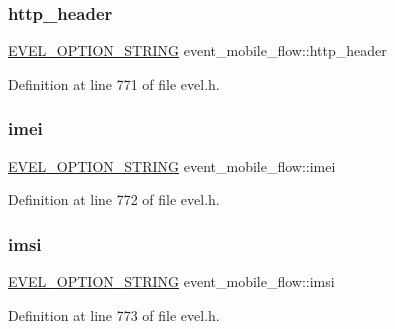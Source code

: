 \subsubsection{\texorpdfstring{http\+\_\+header}{http\_header}}
{\footnotesize\ttfamily \hyperlink{evel_8h_a0de5113a7b72de93c0c7b644f7ea7ec3}{E\+V\+E\+L\+\_\+\+O\+P\+T\+I\+O\+N\+\_\+\+S\+T\+R\+I\+NG} event\+\_\+mobile\+\_\+flow\+::http\+\_\+header}



Definition at line 771 of file evel.\+h.

\hypertarget{structevent__mobile__flow_ad709177c1d1780d9687ad06db4312025}{}\label{structevent__mobile__flow_ad709177c1d1780d9687ad06db4312025} 
\subsubsection{\texorpdfstring{imei}{imei}}
{\footnotesize\ttfamily \hyperlink{evel_8h_a0de5113a7b72de93c0c7b644f7ea7ec3}{E\+V\+E\+L\+\_\+\+O\+P\+T\+I\+O\+N\+\_\+\+S\+T\+R\+I\+NG} event\+\_\+mobile\+\_\+flow\+::imei}



Definition at line 772 of file evel.\+h.

\hypertarget{structevent__mobile__flow_a679225a54e86574386c89a0aca18b522}{}\label{structevent__mobile__flow_a679225a54e86574386c89a0aca18b522} 
\subsubsection{\texorpdfstring{imsi}{imsi}}
{\footnotesize\ttfamily \hyperlink{evel_8h_a0de5113a7b72de93c0c7b644f7ea7ec3}{E\+V\+E\+L\+\_\+\+O\+P\+T\+I\+O\+N\+\_\+\+S\+T\+R\+I\+NG} event\+\_\+mobile\+\_\+flow\+::imsi}



Definition at line 773 of file evel.\+h.

\hypertarget{structevent__mobile__flow_a546ae51e6d62dd9498bfe88546822df7}{}\label{structevent__mobile__flow_a546ae51e6d62dd9498bfe88546822df7} 
